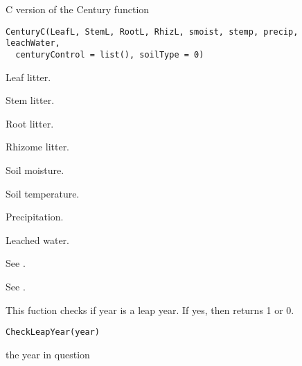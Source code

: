 \documentclass[letterpaper]{book}
\begin{document}
%
\begin{Description}\relax
C version of the Century function
\end{Description}
%
\begin{Usage}
\begin{verbatim}
CenturyC(LeafL, StemL, RootL, RhizL, smoist, stemp, precip, leachWater,
  centuryControl = list(), soilType = 0)
\end{verbatim}
\end{Usage}
%
\begin{Arguments}
\begin{ldescription}
\item[\code{LeafL}] Leaf litter.

\item[\code{StemL}] Stem litter.

\item[\code{RootL}] Root litter.

\item[\code{RhizL}] Rhizome litter.

\item[\code{smoist}] Soil moisture.

\item[\code{stemp}] Soil temperature.

\item[\code{precip}] Precipitation.

\item[\code{leachWater}] Leached water.

\item[\code{centuryControl}] See .

\item[\code{soilType}] See .
\end{ldescription}
\end{Arguments}
%
\begin{Description}\relax
This fuction checks if year is a leap year. If yes, then
returns 1 or 0.
\end{Description}
%
\begin{Usage}
\begin{verbatim}
CheckLeapYear(year)
\end{verbatim}
\end{Usage}
%
\begin{Arguments}
\begin{ldescription}
\item[\code{year}] the year in question
\end{ldescription}
\end{Arguments}
\end{document}
